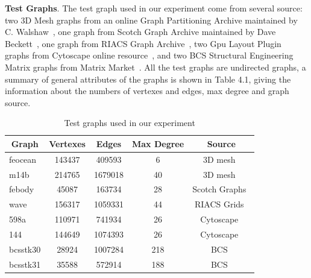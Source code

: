 \documentclass[12pt,glossary]{dalthesis}
\begin{document}
\textbf{Test Graphs}. The test graph used in our experiment come from several source: two 3D Mesh graphs from an online Graph Partitioning Archive maintained by C. Walshaw~\cite{3DMESH}, one graph from Scotch Graph Archive maintained by Dave Beckett~\cite{Scotch}, one graph from RIACS Graph Archive~\cite{RIACS}, two Gpu Layout Plugin graphs from Cytoscape online resource~\cite{Cytoscape}, and two BCS Structural Engineering Matrix graphs from Matrix Market~\cite{Matrix}. All the test graphs are undirected graphs, a summary of general attributes of the graphs is shown in Table 4.1, giving the information about the numbers of vertexes and edges, max degree and graph source.


\begin{table}[ht]
\centering
\caption{ Test graphs used in our experiment }
\label{graph-list}
\begin{tabular}{|l||c|c|c|c|}
\hline
\multicolumn{1}{|c||}{Graph} & Vertexes & Edges   & Max Degree & Source        \\ \hline
feocean                   & 143437   & 409593  & 6          & 3D mesh~\cite{3DMESH}        \\
m14b                      & 214765   & 1679018 & 40         & 3D mesh~\cite{3DMESH}       \\
febody                    & 45087    & 163734  & 28         & Scotch Graphs~\cite{Scotch} \\ 
wave                      & 156317   & 1059331 & 44         & RIACS Grids~\cite{RIACS}    \\
598a                      & 110971   & 741934  & 26         & Cytoscape~\cite{Cytoscape}      \\
144                       & 144649   & 1074393 & 26         & Cytoscape~\cite{Cytoscape}     \\
bcsstk30                  & 28924    & 1007284 & 218        & BCS~\cite{Matrix}    \\
bcsstk31                  & 35588    & 572914  & 188        & BCS~\cite{Matrix}     \\ \hline
\end{tabular}
\end{table}
\end{document}
